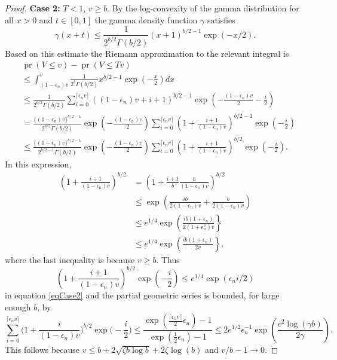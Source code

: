 \documentclass[10pt, reqno]{amsart}
\numberwithin{equation}{section}
\newcommand{\pr}{\mathop{\mathrm{pr}}}
\begin{document}
\begin{appendix}
\begin{proof}
	\noindent \textbf{Case 2:} $T < 1$, $v \geq b$. By the log-convexity of the gamma distribution for all $x > 0$ and $t \in [0,1]$ the gamma density function $\gamma$ satisfies 
	\[ \gamma(x + t) \leq  \frac{1}{2^{b/2} \Gamma(b/2)} (x +1)^{b/2 - 1} \exp(-x/2).
	\]
	Based on this estimate the Riemann approximation to the relevant integral is
	\begin{align}\label{eqCase2}
		\nonumber     &\pr\left( V \leq v \right) - \pr(V \leq Tv) 
		\\
		\nonumber        &\leq \int^{v}_{(1 -\epsilon_n)v} \frac{1}{2^b\Gamma(b/2)} x^{b/2-1} \exp\left( -\frac{x}{2} \right) dx\\
		\nonumber        &\leq \frac{1}{2^{b/2}\Gamma(b/2)} \sum^{ \lceil \epsilon_n v \rceil}_{  i = 0}  ((1 -\epsilon_n)v+i+1)^{b/2-1} \exp\left( -\frac{ (1 -\epsilon_n)v }{2} - \frac{i}{2} \right)\\
		\nonumber        &= \frac{\{(1 -\epsilon_n)v\}^{b/2-1}}{2^{b/2}\Gamma(b/2)} \exp\left( -\frac{ (1 -\epsilon_n)v }{2} \right) \sum^{ \lceil \epsilon_n v \rceil}_{  i = 0}  \left(1+ \frac{i + 1}{(1 -\epsilon_n)v} \right)^{b/2-1} \exp\left(- \frac{i}{2} \right) \\
		&\leq \frac{\{(1 -\epsilon_n)v\}^{b/2-1}}{2^{b/2 -1}\Gamma(b/2)} \exp\left( -\frac{ (1 -\epsilon_n)v }{2} \right) \sum^{ \lceil \epsilon_n v \rceil}_{  i = 0}  \left(1+ \frac{i + 1}{(1 -\epsilon_n)v} \right)^{b/2} \exp\left(- \frac{i}{2} \right).
	\end{align}
	In this expression,
	\begin{align*}
		\left(1+ \frac{i + 1}{(1 -\epsilon_n)v} \right)^{b/2} &= \left(1+ \frac{i + 1}{b} \frac{b}{(1 -\epsilon_n)v} \right)^{b/2} \\
		&\leq \exp\left(\frac{ib}{2(1 -\epsilon_n)v } + \frac{b}{2(1 - \epsilon_n)v}\right) \\
		&\leq e^{1/4}  \exp\left(\frac{ib(1 +\epsilon_n)}{2(1 +\epsilon_n^2)v } \right\}\\
		&\leq e^{1/4}  \exp\left(\frac{ib(1 +\epsilon_n)}{2v } \right\},
	\end{align*}
	where the last inequality is because $v \geq b$. Thus 
	\[
	\left(1+ \frac{i + 1}{(1 -\epsilon_n)v} \right)^{b/2} \exp\left(- \frac{i}{2} \right) \leq e^{1/4}\exp(\epsilon_n i/2 )
	\]
	in equation \eqref{eqCase2} and the partial geometric series is bounded,  for large enough $b$, by
	\[
	\sum^{ \lceil \epsilon_n v \rceil}_{  i = 0}  \biggl(1+ \frac{i}{(1 -\epsilon_n)v} \biggr)^{b/2} \exp\biggl(- \frac{i}{2} \biggr) \leq \frac{  \exp( \frac{\lceil \epsilon_n v \rceil}{2} \epsilon_n ) - 1}{ \exp(\frac{1}{2} \epsilon_n )  -1} \leq 2e^{1/2}\epsilon_n^{-1}\exp\left( \frac{c^2\log(\gamma b)}{2\gamma} \right).
	\]
	This follows because $v \leq b + 2\sqrt{\zeta b\log b} + 2\zeta\log(b)$ and $v/b - 1 \rightarrow 0$. 
	

\end{proof}
\end{appendix}
\end{document}

